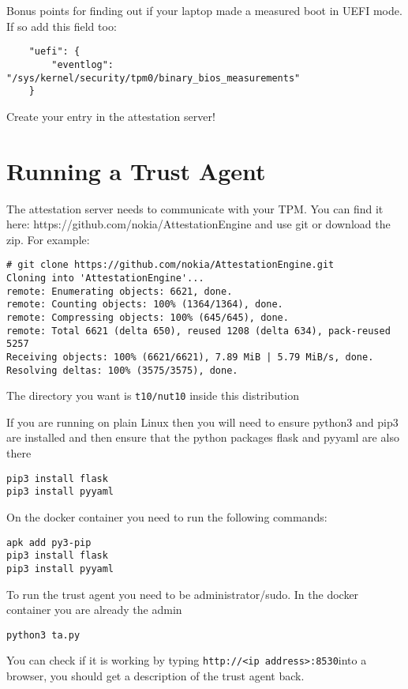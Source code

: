 \documentclass[10pt,a4paper]{article}
\begin{document}
Bonus points for finding out if your laptop made a measured boot in UEFI mode. If so add this field too:

\begin{verbatim}
    "uefi": {
        "eventlog": "/sys/kernel/security/tpm0/binary_bios_measurements"
    }
\end{verbatim}


Create your entry in the attestation server!

\section{Running a Trust Agent}

The attestation server needs to communicate with your TPM.  You can find it here: https://github.com/nokia/AttestationEngine and use git or download the zip. For example:

\begin{verbatim}
# git clone https://github.com/nokia/AttestationEngine.git
Cloning into 'AttestationEngine'...
remote: Enumerating objects: 6621, done.
remote: Counting objects: 100% (1364/1364), done.
remote: Compressing objects: 100% (645/645), done.
remote: Total 6621 (delta 650), reused 1208 (delta 634), pack-reused 5257
Receiving objects: 100% (6621/6621), 7.89 MiB | 5.79 MiB/s, done.
Resolving deltas: 100% (3575/3575), done.
\end{verbatim}


The directory you want is \texttt{t10/nut10} inside this distribution

If you are running on plain Linux then you will need to ensure python3 and pip3 are installed and then ensure that the python packages flask and pyyaml are also there

\begin{verbatim}
pip3 install flask
pip3 install pyyaml
\end{verbatim}


On the docker container you need to run the following commands:

\begin{verbatim}
apk add py3-pip
pip3 install flask
pip3 install pyyaml
\end{verbatim}

To run the trust agent you need to be administrator/sudo. In the docker container you are already the admin

\texttt{python3 ta.py}

You can check if it is working by typing \texttt{http://<ip address>:8530}into a browser, you should get a description of the trust agent back.
\end{document}
